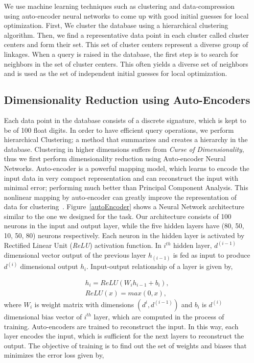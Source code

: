 We use machine learning techniques such as clustering and data-compression using auto-encoder neural networks to come up with good initial guesses for local optimization.
First, We cluster the database using a hierarchical clustering algorithm.
Then, we find a representative data point in each cluster called cluster centers and form their set.
This set of cluster centers represent a diverse group of linkages.
When a query is raised in the database, the first step is to search for neighbors in the set of cluster centers.
This often yields a diverse set of neighbors and is used as the set of independent initial guesses for local optimization.

\subsection{Dimensionality Reduction using Auto-Encoders}
Each data point in the database consists of a discrete signature, which is kept to be of 100 float digits.
In order to have efficient query operations, we perform hierarchical Clustering; a method that summarizes and creates a hierarchy in the database.
Clustering in higher dimensions suffers from \emph{Curse of Dimensionality}\cite{marimont1979}, thus we first perform dimensionality reduction using Auto-encoder Neural Networks.
Auto-encoder is a powerful mapping model, which learns to encode the input data in very compact representation and can reconstruct the input with minimal error; performing much better than Principal Component Analysis\cite{hinton2006}.
This nonlinear mapping by auto-encoder can greatly improve the representation of data for clustering~\cite{song2013}.
Figure~\ref{autoEncoder} shows a Neural Network architecture similar to the one we designed for the task.
Our architecture consists of 100 neurons in the input and output layer, while the five hidden layers have (80, 50, 10, 50, 80) neurons respectively.
Each neuron in the hidden layer is activated by Rectified Linear Unit (\emph{ReLU}) activation function.
In $i^{th}$ hidden layer, $d^{(i-1)}$ dimensional vector output of the previous layer $h_(i-1)$ is fed as input to produce $d^{(i)}$ dimensional output $h_i$.
Input-output relationship of a layer is given by,

\begin{eqnarray}\label{nnlayer}
  h_i = ReLU(W_{i}h_{i-1} + b_{i}), \\
  ReLU(x) = max(0, x),
\end{eqnarray}
where $W_i$ is weight matrix with dimensions $(d^{i}, d^{(i-1)})$ and $b_i$ is $d^{(i)}$ dimensional bias vector of $i^{th}$ layer, which are computed in the process of training.
Auto-encoders are trained to reconstruct the input.
In this way, each layer encodes the input, which is sufficient for the next layers to reconstruct the output.
The objective of training is to find out the set of weights and biases that minimizes the error loss given by,

